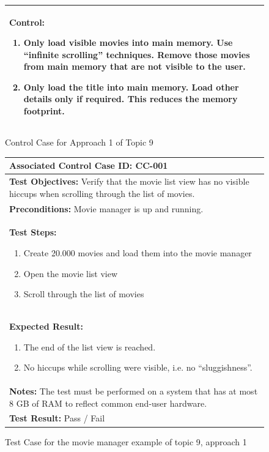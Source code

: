 \begin{figure}[p!]
\begin{tabular}{|p{}|}
		\hline
		\textbf{Control}: 
		\begin{enumerate}
			\item Only load visible movies into main memory. Use \enquote{infinite scrolling} techniques. Remove those movies from main memory that are not visible to the user.
			\item Only load the title into main memory. Load other details only if required. This reduces the memory footprint.
		\end{enumerate} \\
		\hline
	\end{tabular}
	\caption{Control Case for Approach 1 of Topic 9}
	\label{tbl:topic_9_approach_1}
\end{figure}


%
%
%
\begin{figure}[h!]
	\centering
	\begin{tabular}{|p{}|}\hline
		\textbf{Associated Control Case ID:} CC-001\\
		\hline
		\textbf{Test Objectives:} \newline Verify that the movie list view has no visible hiccups when scrolling through the list of movies. \\
		\hline
		\textbf{Preconditions:} Movie manager is up and running.\\
		\hline
		\textbf{Test Steps:} \begin{enumerate}
			\item Create 20.000 movies and load them into the movie manager
			\item Open the movie list view
			\item Scroll through the list of movies
		\end{enumerate} \\
		\hline
		\textbf{Expected Result:} \begin{enumerate}
			\item The end of the list view is reached.
			\item No hiccups while scrolling were visible, i.e. no \enquote{sluggishness}.
		\end{enumerate} \\
		\hline
		\textbf{Notes:} \newline
		The test must be performed on a system that has at most 8 GB of RAM to reflect common end-user hardware. \\
		\hline
		\textbf{Test Result:} Pass / Fail \\
		\hline
										
	\end{tabular}
	\caption{Test Case for the movie manager example of topic 9, approach 1}
	\label{tbl:topic_9_test_case}
\end{figure}

